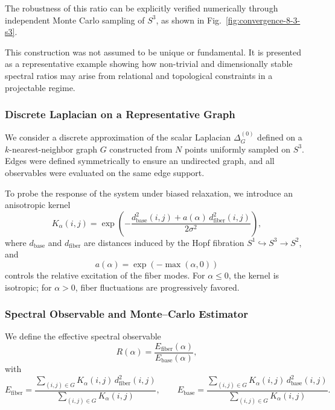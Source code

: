   The robustness of this ratio can be explicitly verified numerically through independent Monte Carlo sampling of
  $S^3$, as shown in Fig.~\ref{fig:convergence-8-3-s3}.

  This construction was not assumed to be unique or fundamental.
  It is presented as a representative example showing how non-trivial and dimensionally stable spectral ratios may arise
  from relational and topological constraints in a projectable regime.

  \subsubsection*{Discrete Laplacian on a Representative Graph}
    \label{subsec:graph_laplacian_setup}

    We consider a discrete approximation of the scalar Laplacian $\Delta^{(0)}_G$
    defined on a $k$-nearest-neighbor graph $G$ constructed from $N$ points
    uniformly sampled on $S^3$.
    Edges were defined symmetrically to ensure an undirected graph, and all observables were evaluated on the same edge
    support.

    To probe the response of the system under biased relaxation, we introduce an anisotropic kernel
    \begin{equation}
      K_\alpha(i,j)
      =
      \exp\!\left(
              -\frac{
          d_{\text{base}}^2(i,j)
          +
          a(\alpha)\, d_{\text{fiber}}^2(i,j)
        }{2\sigma^2}
      \right),
      \label{eq:anisotropic_kernel}
    \end{equation}
    where $d_{\text{base}}$ and $d_{\text{fiber}}$ are distances induced by the Hopf fibration
    $S^1 \hookrightarrow S^3 \to S^2$,
    and
    \begin{equation}
      a(\alpha) = \exp(-\max(\alpha,0))
    \end{equation}
    controls the relative excitation of the fiber modes.
    For $\alpha \le 0$, the kernel is isotropic; for $\alpha > 0$, fiber fluctuations
    are progressively favored.

  \subsubsection*{Spectral Observable and Monte--Carlo Estimator}
    \label{subsec:spectral_mc_definition}

    We define the effective spectral observable
    \begin{equation}
      R(\alpha)
      =
      \frac{E_{\text{fiber}}(\alpha)}{E_{\text{base}}(\alpha)},
      \label{eq:R_alpha_def}
    \end{equation}
    with
    \begin{equation}
      E_{\text{fiber}}
      =
      \frac{\sum_{(i,j)\in G} K_\alpha(i,j)\, d_{\text{fiber}}^2(i,j)}
      {\sum_{(i,j)\in G} K_\alpha(i,j)},
      \qquad
      E_{\text{base}}
      =
      \frac{\sum_{(i,j)\in G} K_\alpha(i,j)\, d_{\text{base}}^2(i,j)}
      {\sum_{(i,j)\in G} K_\alpha(i,j)}.
    \end{equation}

